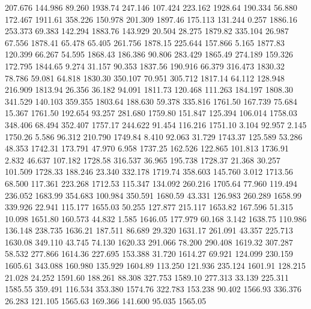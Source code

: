  207.676  144.986   89.260      1938.74
 247.146  107.424  223.162      1928.64
 190.334   56.880  172.467      1911.61
 358.226  150.978  201.309      1897.46
 175.113  131.244    0.257      1886.16
 253.373   69.383  142.294      1883.76
 143.929   20.504   28.275      1879.82
 335.104   26.987   67.556      1878.41
  65.478   65.405  261.756      1878.15
 225.644  157.866    5.165      1877.83
 120.399   66.267   54.595      1868.43
 186.386   90.806  283.429      1865.49
 274.189  159.326  172.795      1844.65
   9.274   31.157   90.353      1837.56
 190.916   66.379  316.473      1830.32
  78.786   59.081   64.818      1830.30
 350.107   70.951  305.712      1817.14
  64.112  128.948  216.909      1813.94
  26.356   36.182   94.091      1811.73
 120.468  111.263  184.197      1808.30
 341.529  140.103  359.355      1803.64
 188.630   59.378  335.816      1761.50
 167.739   75.684   15.367      1761.50
 192.654   93.257  281.680      1759.80
 151.847  125.394  106.014      1758.03
 348.406   68.494  352.407      1757.17
 244.622   91.454  116.216      1751.10
   3.104   92.957    2.145      1750.26
   5.586   96.312  210.790      1749.84
   8.410   92.063   31.729      1743.37
 125.589   53.286   48.353      1742.31
 173.791   47.970    6.958      1737.25
 162.526  122.865  101.813      1736.91
   2.832   46.637  107.182      1728.58
 316.537   36.965  195.738      1728.37
  21.368   30.257  101.509      1728.33
 188.246   23.340  332.178      1719.74
 358.603  145.760    3.012      1713.56
  68.500  117.361  223.268      1712.53
 115.347  134.092  260.216      1705.64
  77.960  119.494  236.052      1683.99
 354.683  100.984  350.591      1680.59
  43.331  126.983  260.289      1658.99
 339.926   22.941  115.177      1655.03
  50.255  127.877  215.117      1653.82
 167.596   51.315   10.098      1651.80
 160.573   44.832    1.585      1646.05
 177.979   60.168    3.142      1638.75
 110.986  136.148  238.735      1636.21
 187.511   86.689   29.320      1631.17
 261.091   43.357  225.713      1630.08
 349.110   43.745   74.130      1620.33
 291.066   78.200  290.408      1619.32
 307.287   58.532  277.866      1614.36
 227.695  153.388   31.720      1614.27
  69.921  124.099  230.159      1605.61
 343.088  160.980  135.929      1604.89
 113.250  121.936  235.124      1601.91
 128.215   21.028   24.252      1591.60
 188.261   88.308  327.753      1589.10
 277.313   33.139  225.311      1585.55
 359.491  116.534  353.380      1574.76
 322.783  153.238   90.402      1566.93
 336.376   26.283  121.105      1565.63
 169.366  141.600   95.035      1565.05

